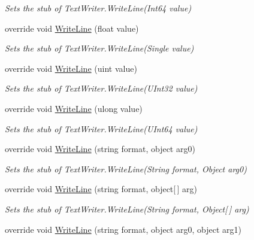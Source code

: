 \begin{DoxyCompactItemize}
\begin{DoxyCompactList}\small\item\em Sets the stub of Text\-Writer.\-Write\-Line(\-Int64 value)\end{DoxyCompactList}\item 
override void \hyperlink{class_system_1_1_i_o_1_1_fakes_1_1_stub_text_writer_a8727559762ae7d83babfe54b193a911a}{Write\-Line} (float value)
\begin{DoxyCompactList}\small\item\em Sets the stub of Text\-Writer.\-Write\-Line(\-Single value)\end{DoxyCompactList}\item 
override void \hyperlink{class_system_1_1_i_o_1_1_fakes_1_1_stub_text_writer_a3d9c4eaa635debc34d363679b9779812}{Write\-Line} (uint value)
\begin{DoxyCompactList}\small\item\em Sets the stub of Text\-Writer.\-Write\-Line(\-U\-Int32 value)\end{DoxyCompactList}\item 
override void \hyperlink{class_system_1_1_i_o_1_1_fakes_1_1_stub_text_writer_a8ec9167155b1d7d5d2b24f35c43e44c7}{Write\-Line} (ulong value)
\begin{DoxyCompactList}\small\item\em Sets the stub of Text\-Writer.\-Write\-Line(\-U\-Int64 value)\end{DoxyCompactList}\item 
override void \hyperlink{class_system_1_1_i_o_1_1_fakes_1_1_stub_text_writer_a5e8220230523b5c9842d046677176c28}{Write\-Line} (string format, object arg0)
\begin{DoxyCompactList}\small\item\em Sets the stub of Text\-Writer.\-Write\-Line(\-String format, Object arg0)\end{DoxyCompactList}\item 
override void \hyperlink{class_system_1_1_i_o_1_1_fakes_1_1_stub_text_writer_a2c22f47b79b26ed500ca5449844a06f8}{Write\-Line} (string format, object\mbox{[}$\,$\mbox{]} arg)
\begin{DoxyCompactList}\small\item\em Sets the stub of Text\-Writer.\-Write\-Line(\-String format, Object\mbox{[}$\,$\mbox{]} arg)\end{DoxyCompactList}\item 
override void \hyperlink{class_system_1_1_i_o_1_1_fakes_1_1_stub_text_writer_aaf49a09bbd42c0728b3c15e0b13eb06d}{Write\-Line} (string format, object arg0, object arg1)

\end{DoxyCompactItemize}
